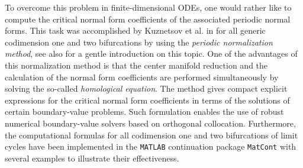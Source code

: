 \documentclass[english]{myarticle}
\begin{document}
\begin{sloppypar}
To overcome this problem in finite-dimensional ODEs, one would rather like to compute the critical normal form coefficients of the associated periodic normal forms. This task was accomplished by Kuznetsov et al. in \cite{Kuznetsov2005,Witte2014,Witte2013} for all generic codimension one and two bifurcations by using the \emph{periodic normalization method}, see also \cite[Section 5.6]{Kuznetsov2023a} for a gentle introduction on this topic. One of the advantages of this normalization method is that the center manifold reduction and the calculation of the normal form coefficients are performed simultaneously by solving the so-called \emph{homological equation}. The method gives compact explicit
expressions for the critical normal form coefficients in terms of the solutions of certain boundary-value problems. Such formulation enables the use of robust numerical boundary-value solvers based on orthogonal collocation. Furthermore, the computational formulas for all codimension one \cite{Kuznetsov2005} and two \cite{Witte2014,Witte2013} bifurcations of limit cycles have been implemented in the \verb|MATLAB| continuation package \verb|MatCont| \cite{Matcont} with several examples to illustrate their effectiveness.


\end{sloppypar}
\end{document}
